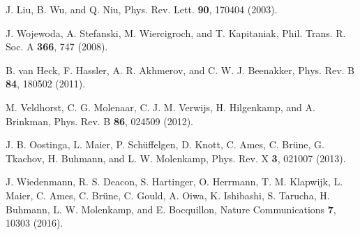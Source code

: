 \documentclass[aps,prl,twocolumn,showpacs,showpacs,10pt,superscriptaddress]{revtex4-1}
\begin{document}
\begin{thebibliography}{00}
 J. Liu, B. Wu, and Q. Niu, Phys. Rev. Lett. \textbf{90}, 170404 (2003).

 J. Wojewoda, A. Stefanski, M. Wiercigroch, and T. Kapitaniak, Phil. Trans. R. Soc. A \textbf{366}, 747 (2008).

 B. van Heck, F. Hassler, A. R. Akhmerov, and C. W. J. Beenakker, Phys. Rev. B \textbf{84}, 180502 (2011).

 M. Veldhorst, C. G. Molenaar, C. J. M. Verwijs, H. Hilgenkamp, and A. Brinkman, Phys. Rev. B \textbf{86}, 024509 (2012).


 J. B. Oostinga, L. Maier, P. Sch{\"{u}}ffelgen, D. Knott, C. Ames, C. Br{\"{u}}ne, G. Tkachov, H. Buhmann, and L. W. Molenkamp, Phys. Rev. X \textbf{3}, 021007 (2013).

 J. Wiedenmann, R. S. Deacon, S. Hartinger, O. Herrmann, T. M. Klapwijk, L. Maier, C. Ames, C. Br\"{u}ne, C. Gould, A. Oiwa, K. Ishibashi, S. Tarucha, H. Buhmann, L. W. Molenkamp, and E. Bocquillon, Nature Communications \textbf{7}, 10303 (2016). 




\end{thebibliography}
\end{document}
